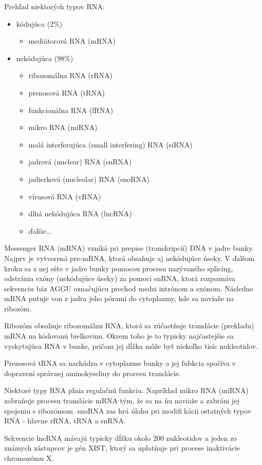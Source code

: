 \indent Prehľad niektorých typov RNA:
\begin{itemize}
\item kódujúca (2\%)
\begin{itemize}
\item mediátorová RNA (mRNA)
\end{itemize}
\item nekódujúca (98\%)
\begin{itemize}
\item ribozomálna RNA (rRNA)
\item prenosová RNA (tRNA)
\item funkcionálna RNA (fRNA)
\item mikro RNA (miRNA)
\item malá interferujúca (small interfering) RNA (siRNA)
\item jadrová (nuclear) RNA (snRNA)
\item jadierková (nucleolar) RNA (snoRNA)
\item vírusová RNA (vRNA)
\item dlhá nekódujúca RNA (lncRNA)
\item ďalšie...
\end{itemize}
\end{itemize}

\indent Messenger RNA (mRNA) vzniká pri prepise (transkripcií) DNA v jadre bunky. Najprv je vytvorená pre-mRNA, ktorá obsahuje aj nekódujúce úseky. V ďalšom kroku sa z nej ešte v jadre bunky pomocou procesu nazývaného splicing, odstránia exóny (nekódujúce úseky)  za pomoci snRNA, ktorá rozpoznáva sekvenciu báz AGGU označujúcu prechod medzi intrónom  a exónom. Následne mRNA putuje von z jadra jeho pórami do cytoplazmy, kde sa naviaže na ribozóm. \cite{Alberts02}


\indent Ribozóm obsahuje ribozomálnu RNA, ktorá sa zúčastňuje translácie  (prekladu) mRNA na kódovanú bielkovinu. Okrem toho je to typicky najčastejšie sa vyskytujúca RNA v bunke, pričom jej dĺžka môže byť niekoľko tisíc nukleotidov.


\indent Prenosová tRNA sa nachádza v cytoplazme bunky a jej fubkcia spočíva v dopravení správnej aminokyseliny do procesu translácie.


\indent  Niektoré typy RNA plnia regulačnú funkciu. Napríklad mikro RNA (miRNA)
zabraňuje procesu translácie mRNA tým, že sa na ňu naviaže a zabráni jej spojeniu s ribozómom. snoRNA zas hrá úlohu pri modifikácii
ostatných typov RNA - hlavne rRNA, tRNA a snRNA.


\indent Sekvencie lncRNA mávajú typicky dĺžku okolo 200 nukleotidov a jeden zo známych zástupcov je gén XIST, ktorý sa
uplatňuje pri procese inaktivácie chromozómu X. \cite{Rinn a Chang, 2012}


